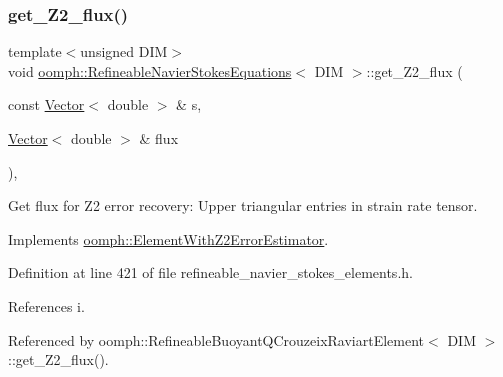 \mbox{\label{classoomph_1_1RefineableNavierStokesEquations_af26506994293f9d72d0382c1efe67749}} 
\subsubsection{\texorpdfstring{get\+\_\+\+Z2\+\_\+flux()}{get\_Z2\_flux()}}
{\footnotesize\ttfamily template$<$unsigned D\+IM$>$ \\
void \hyperlink{classoomph_1_1RefineableNavierStokesEquations}{oomph\+::\+Refineable\+Navier\+Stokes\+Equations}$<$ D\+IM $>$\+::get\+\_\+\+Z2\+\_\+flux (\begin{DoxyParamCaption}\item[{const \hyperlink{classoomph_1_1Vector}{Vector}$<$ double $>$ \&}]{s,  }\item[{\hyperlink{classoomph_1_1Vector}{Vector}$<$ double $>$ \&}]{flux }\end{DoxyParamCaption})\hspace{0.3cm}{\ttfamily [inline]}, {\ttfamily [virtual]}}



Get \textquotesingle{}flux\textquotesingle{} for Z2 error recovery\+: Upper triangular entries in strain rate tensor. 



Implements \hyperlink{classoomph_1_1ElementWithZ2ErrorEstimator_a5688ff5f546d81771cabad82ca5a7556}{oomph\+::\+Element\+With\+Z2\+Error\+Estimator}.



Definition at line 421 of file refineable\+\_\+navier\+\_\+stokes\+\_\+elements.\+h.



References i.



Referenced by oomph\+::\+Refineable\+Buoyant\+Q\+Crouzeix\+Raviart\+Element$<$ D\+I\+M $>$\+::get\+\_\+\+Z2\+\_\+flux().

\mbox{\label{classoomph_1_1RefineableNavierStokesEquations_a7eb93c82d587b3b3c3782e3dc0d0874f}} 
